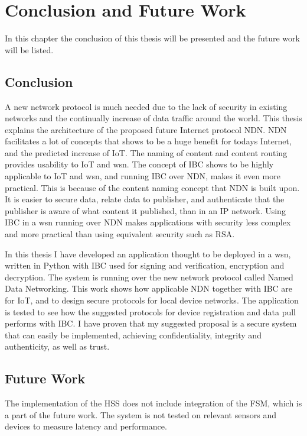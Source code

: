 \chapter{Conclusion and Future Work}\label{chp7:conclusion}
In this chapter the conclusion of this thesis will be presented and the future work will be listed.

\section{Conclusion}
A new network protocol is much needed due to the lack of security in existing networks and the continually increase of data traffic around the world. 
This thesis explains the architecture of the proposed future Internet protocol \gls{NDN}.
\gls{NDN} facilitates a lot of concepts that shows to be a huge benefit for todays Internet, and the predicted increase of \gls{IoT}.
The naming of content and content routing provides usability to \gls{IoT} and \gls{wsn}.
The concept of \gls{IBC} shows to be highly applicable to \gls{IoT} and \gls{wsn}, and running \gls{IBC} over \gls{NDN}, makes it even more practical.
This is because of the content naming concept that \gls{NDN} is built upon. 
It is easier to secure data, relate data to publisher, and authenticate that the publisher is aware of what content it published, than in an \gls{IP} network. 
Using \gls{IBC} in a \gls{wsn} running over \gls{NDN} makes applications with security less complex and more practical than using equivalent security such as RSA. 

In this thesis I have developed an application thought to be deployed in a \gls{wsn}, written in Python with \gls{IBC} used for signing and verification, encryption and decryption.
The system is running over the new network protocol called Named Data Networking.
This work shows how applicable \gls{NDN} together with \gls{IBC} are for \gls{IoT}, and to design secure protocols for local device networks.
The application is tested to see how the suggested protocols for device registration and data pull performs with \gls{IBC}. 
I have proven that my suggested proposal is a secure system that can easily be implemented, achieving confidentiality, integrity and authenticity, as well as trust.

\section{Future Work}
The implementation of the \gls{HSS} does not include integration of the \gls{FSM}, which is a part of the future work.
The system is not tested on relevant sensors and devices to measure latency and performance.

